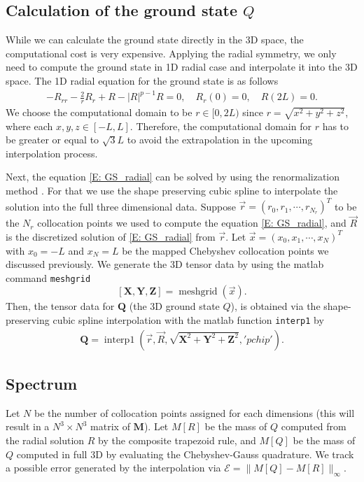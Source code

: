 \documentclass[12pt,letterpaper]{amsart}
\theoremstyle{remark}
\numberwithin{equation}{section}
\numberwithin{theorem}{section}
\numberwithin{table}{section}
\begin{document}
\subsection{Calculation of the ground state $Q$}%
While we can calculate the ground state directly in the 3D space, the computational cost is very expensive. Applying the radial symmetry, we only need to compute the ground state in 1D radial case and interpolate it into the 3D space. The 1D radial equation for the ground state is as follows
\begin{align}\label{E: GS_radial}
-R_{rr}-\frac{2}{r}R_r+R-|R|^{p-1}R=0, \quad R_r(0)=0, \quad R(2 L)=0.
\end{align}
We choose the computational domain to be $r \in [0,2L)$ since $r=\sqrt{x^2+y^2+z^2}$, where each $x,y,z \in [-L,L]$. Therefore, the computational domain for $r$ has to be greater or equal to $\sqrt{3}L$ to avoid the extrapolation in the upcoming interpolation process.

Next, the equation \eqref{E: GS_radial} can be solved by using the renormalization method \cite[Chapter 24]{F2016}. For that we use the shape preserving cubic spline to interpolate the solution into the full three dimensional data. Suppose $\vec{r}=(r_0,r_1,\cdots, r_{N_r})^T$ to be the $N_r$ collocation points we used to compute the equation \eqref{E: GS_radial}, and $\vec{R}$ is the discretized solution of \eqref{E: GS_radial} from $\vec{r}$. Let $\vec{x}=(x_0,x_1,\cdots,x_N)^T $ with $x_0=-L$ and $x_N=L$ be the mapped Chebyshev collocation points we discussed previously. We generate the 3D tensor data by using the matlab command \texttt{meshgrid}
$$
[\mathbf{X},\mathbf{Y},\mathbf{Z}]=\operatorname{meshgrid}(\vec{x}).
$$
Then, the tensor data for $\mathbf{Q}$ (the 3D ground state $Q$), is obtained via the shape-preserving cubic spline interpolation with the matlab function \texttt{interp1} by
\begin{align*}
\mathbf{Q}=\operatorname{interp1}(\vec{r},\vec{R},\sqrt{\mathbf{X}^2 +\mathbf{Y}^2 +\mathbf{Z}^2},'pchip').
\end{align*}

\subsection{Spectrum} %
Let $N$ be the number of collocation points assigned for each dimensions (this will result in a $N^3 \times N^3$ matrix of $\mathbf{M}$). 
Let $M[R]$ be the mass of $Q$ computed from the radial solution $R$ by the composite trapezoid rule, and $M[Q]$ be the mass of $Q$ computed in full 3D %
by evaluating the Chebyshev-Gauss quadrature. We track a possible error generated by the interpolation via $\mathcal{E}=\| M[Q]-M[R] \|_{\infty}$. 
\end{document}
